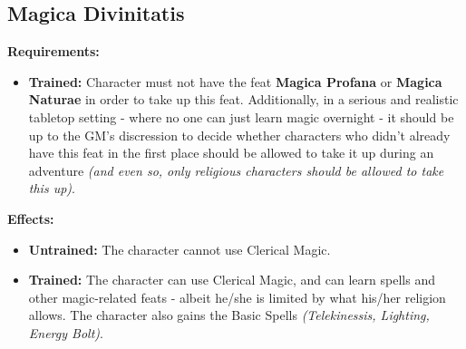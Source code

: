\subsection{Magica Divinitatis}
\begin{table}[!ht]
\centering
{}
\end{table}
\textbf{Requirements:}
\begin{itemize}
	\item \textbf{Trained:} Character must not have the feat \textbf{Magica Profana} or \textbf{Magica Naturae} in order to take up this feat. Additionally, in a serious and realistic tabletop setting - where no one can just learn magic overnight - it should be up to the GM's discression to decide whether characters who didn't already have this feat in the first place should be allowed to take it up during an adventure \textit{(and even so, only religious characters should be allowed to take this up)}.
\end{itemize}
\textbf{Effects:}
\begin{itemize}
	\item \textbf{Untrained:} The character cannot use Clerical Magic.
	\item \textbf{Trained:} The character can use Clerical Magic, and can learn spells and other magic-related feats - albeit he/she is limited by what his/her religion allows. The character also gains the Basic Spells \textit{(Telekinessis, Lighting, Energy Bolt)}.
\end{itemize}\newpage
